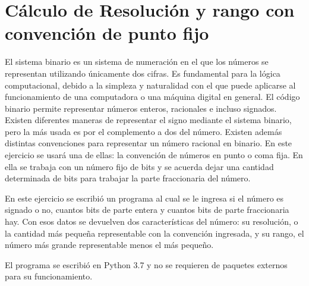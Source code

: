 \section{Cálculo de Resolución y rango con convención de punto fijo}
El sistema binario es un sistema de numeración en el que los números se representan utilizando únicamente dos cifras. Es fundamental para la lógica computacional, debido a la simpleza y naturalidad con el que puede aplicarse al funcionamiento de una computadora o una máquina digital en general. El código binario permite representar números enteros, racionales e incluso signados. Existen diferentes maneras de representar el signo mediante el sistema binario, pero la más usada es por el complemento a dos del número. Existen además distintas convenciones para representar un número racional en binario. En este ejercicio se usará una de ellas: la convención de números en punto o coma fija. En ella se trabaja con un número fijo de bits y se acuerda dejar una cantidad determinada de bits para trabajar la parte fraccionaria del número. 

En este ejercicio se escribió un programa al cual se le ingresa si el número es signado o no, cuantos bits de parte entera y cuantos bits de parte fraccionaria hay. Con esos datos se devuelven dos características del número: su resolución, o la cantidad más pequeña representable con la convención ingresada, y su rango, el número más grande representable menos el más pequeño. 

El programa se escribió en Python 3.7 y no se requieren de paquetes externos para su funcionamiento.